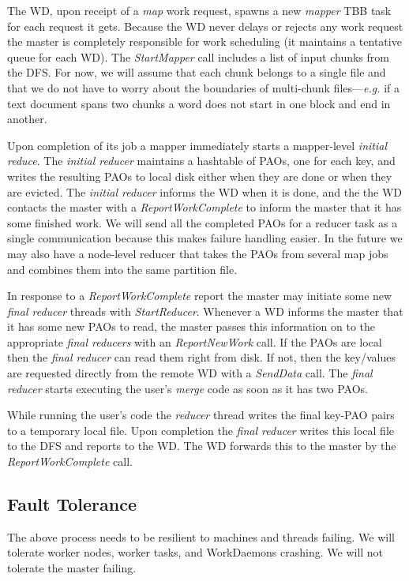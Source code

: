 \documentclass[10pt,letter,final,article,twocolumn]{article} %
\newcommand{\rpc}[1]{\emph{#1}}
\begin{document}
The WD, upon receipt of a \emph{map} work request, spawns a new \emph{mapper} TBB task for each request it gets. Because the WD never delays or rejects any work request the master is completely responsible for work scheduling (it maintains a tentative queue for each WD). The \rpc{StartMapper} call includes a list of input chunks from the DFS. For now, we will assume that each chunk belongs to a single file and that we do not have to worry about the boundaries of multi-chunk files---\textit{e.g.} if a text document spans two chunks a word does not start in one block and end in another.

Upon completion of its job a mapper immediately starts a mapper-level \emph{initial reduce}. The \emph{initial reducer} maintains a hashtable of PAOs, one for each key, and writes the resulting PAOs to local disk either when they are done or when they are evicted. The \emph{initial reducer} informs the WD when it is done, and the the WD contacts the master with a \rpc{ReportWorkComplete} to inform the master that it has some finished work. We will send all the completed PAOs for a reducer task as a single communication because this makes failure handling easier. In the future we may also have a node-level reducer that takes the PAOs from several map jobs and combines them into the same partition file.

In response to a \rpc{ReportWorkComplete} report the master may initiate some new \emph{final reducer} threads with \rpc{StartReducer}. Whenever a WD informs the master that it has some new PAOs to read, the master passes this information on to the appropriate \emph{final reducers} with an \rpc{ReportNewWork} call. If the PAOs  are local then the \emph{final reducer} can read them right from disk. If not, then the key/values are requested directly from the remote WD with a \rpc{SendData} call. The \emph{final reducer} starts executing the user's \emph{merge} code as soon as it has two PAOs.

While running the user's code the \emph{reducer} thread writes the final key-PAO pairs to a temporary local file. Upon completion the \emph{final reducer} writes this local file to the DFS and reports to the WD. The WD forwards this to the master by the \rpc{ReportWorkComplete} call.

\subsection{Fault Tolerance}
The above process needs to be resilient to machines and threads failing. We will tolerate worker nodes, worker tasks, and WorkDaemons crashing. We will not tolerate the master failing.
\end{document}
